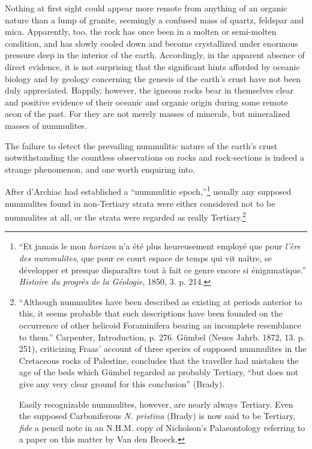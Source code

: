 \documentclass[a4paper, 12pt, oneside]{article}
\begin{document}
Nothing at first sight could appear more remote from anything of an organic nature than a lump of granite, seemingly a confused mass of quartz, feldspar and mica. Apparently, too, the rock has once been in a molten or semi-molten condition, and has slowly cooled down and become crystallized under enormous pressure deep in the interior of the earth. Accordingly, in the apparent absence of direct evidence, it is not surprising that the significant hints afforded by oceanic biology and by geology concerning the genesis of the earth's crust have not been duly appreciated. Happily, however, the igneous rocks bear in themselves clear and positive evidence of their oceanic and organic origin during some remote aeon of the past. For they are not merely masses of minerals, but mineralized masses of nummulites.

The failure to detect the prevailing nummulitic nature of the earth's crust notwithstanding the countless observations on rocks and rock-sections is indeed a strange phenomenon, and one worth enquiring into.

After d'Archiac had established a ``nummulitic epoch,''\footnote{``Et jamais le mon \emph{horizon} n'a été plus heureusement employé que pour \emph{l'ère des nummulites}, que pour ce court espace de temps qui vit naître, se développer et presque disparaître tout à fait ce genre encore si énignmatique.'' \emph{Histoire du progrès de la Géologie}, 1850, 3. p. 214.} usually any supposed nummulites found in non-Tertiary strata were either considered not to be nummulites at all, or the strata were regarded as really Tertiary.\footnote{``Although nummulites have been described as existing at periods anterior to this, it seems probable that such descriptions have been founded on the occurrence of other helicoid Foraminifera bearing an incomplete resemblance to them.'' Carpenter, Introduction, p. 276. Gümbel (Neues Jahrb. 1872, 13. p. 251), criticizing Fraas' account of three species of supposed nummulites in the Cretaceous rocks of Palestine, concludes that the traveller had mistaken the age of the beds which Gümbel regarded as probably Tertiary, ``but does not give any very clear ground for this conclusion'' (Brady).

Easily recognizable nummulites, however, are nearly always Tertiary. Even the supposed Carboniferous \emph{N. pristina} (Brady) is now said to be Tertiary, \emph{fide} a pencil note in an N.H.M. copy of Nicholson's Palaeontology referring to a paper on this matter by Van den Broeck.}
\end{document}
